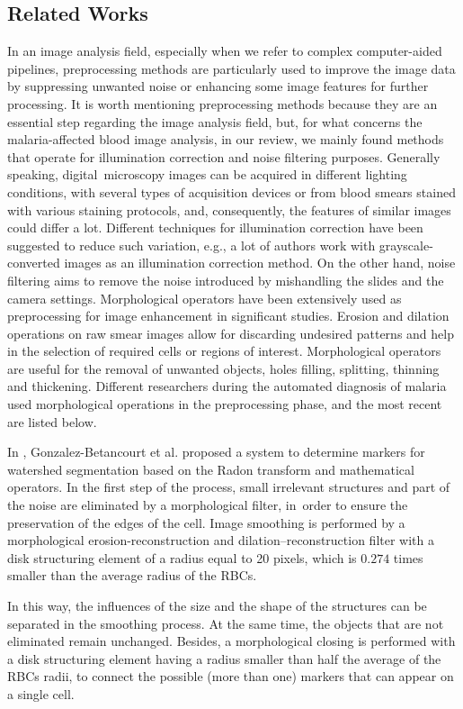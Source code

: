 \documentclass[final,a4paper,12pt,english]{UnicaPhdThesis3}
\begin{document}
\subsection{Related Works}
In an image analysis field, especially when we refer to complex computer-aided pipelines, preprocessing methods are particularly used to improve the image data by suppressing unwanted noise or enhancing some image features for further processing.
It is worth mentioning preprocessing methods because they are an essential step regarding the image analysis field, but, for what concerns the malaria-affected blood image analysis, in our review, we mainly found methods that operate for illumination correction and noise filtering purposes.
Generally speaking, digital~microscopy images can be acquired in different lighting conditions, with several types of acquisition devices or from blood smears stained with various staining protocols, and, consequently, the features of similar images could differ a lot.
Different techniques for illumination correction have been suggested to reduce such variation, e.g., a lot of authors work with grayscale-converted images as an illumination correction method.
On the other hand, noise filtering aims to remove the noise introduced by mishandling the slides and the camera settings.
Morphological operators have been extensively used as preprocessing for image enhancement in significant studies.
Erosion and dilation operations on raw smear images allow for discarding undesired patterns and help in the selection of required cells or regions of interest. Morphological operators are useful for the removal of unwanted
objects, holes filling, splitting, thinning and thickening. Different researchers during the automated diagnosis of malaria used morphological operations in the preprocessing phase, and the most recent are listed below.

In \cite{Gonzalez2016}, Gonzalez-Betancourt et al. proposed a system to determine markers for watershed segmentation based on the Radon transform and mathematical operators. In the first step of the process, small irrelevant structures and part of the noise are eliminated by a morphological filter, in~order to ensure the preservation of the edges of the cell. Image smoothing is performed by a morphological erosion-reconstruction and dilation--reconstruction filter with a disk structuring element of a radius equal to 20 pixels, which is $0.274$ times smaller than the average radius of the RBCs. 

In this way, the influences of the size and the shape of the structures can be separated in the smoothing process. At the same time, the objects that are not eliminated remain unchanged. Besides, a morphological closing is performed with a disk structuring element having a radius smaller than half the average of the RBCs radii, to connect the possible (more than one) markers that can appear on a single cell.
\end{document}
